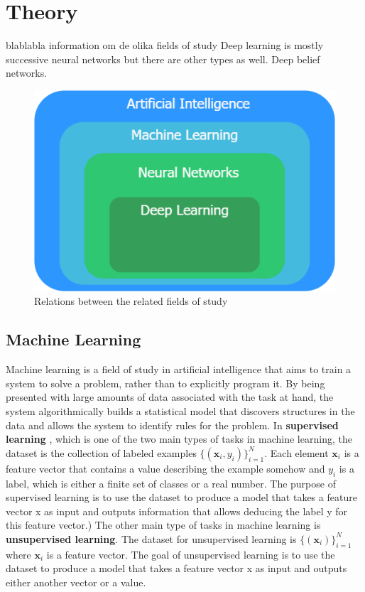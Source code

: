 \documentclass[nofilelist]{cslthse-msc}
\begin{document}
\chapter{Theory}

blablabla information om de olika fields of study
Deep learning is mostly successive neural networks but there are other types as well. Deep belief networks. 

\begin{figure}[h!]
    \centering
    \includegraphics[scale=0.4]{msccls/explanatory_images/map_of_techniques.png}
    \caption{Relations between the related fields of study }
    \label{fig:map}
\end{figure}

\section{Machine Learning}
Machine learning \citep{franoischollet2017learning} is a field of study in artificial intelligence that aims to train a system to solve a problem, rather than to explicitly program it. By being presented with large amounts of data associated with the task at hand, the system algorithmically builds a statistical model that discovers structures in the data and allows the system to identify rules for the problem. 
In \textbf{supervised learning} \citep{100pageBurkov}, which is one of the two main types of tasks in machine learning, the dataset is the collection of labeled examples $\{(\mathbf{x}_i, y_i)\}_{i=1}^N.$ Each element $\mathbf{x}_i$ is a feature vector that contains a value describing the example somehow and $y_i$ is a label, which is either a finite set of classes or a real number. The purpose of supervised learning is to use the dataset to produce a model that takes a feature vector x as input and outputs information that allows deducing the label y for this feature vector.) 
The other main type of tasks in machine learning is \textbf{unsupervised learning}. The dataset for unsupervised learning is $\{ (\mathbf{x}_i)\}_{i=1}^N$ where $\mathbf{x}_i$ is a feature vector. The goal of unsupervised learning is to use the dataset to produce a model that takes a feature vector x as input and outputs either another vector or a value. 
\end{document}
